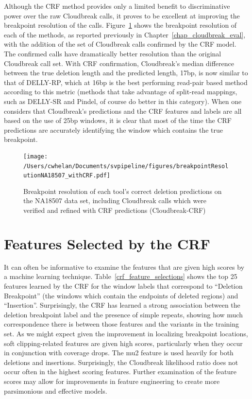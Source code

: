 Although the CRF method provides only a limited benefit to discriminative power over the raw Cloudbreak calls, it proves to be excellent at improving the breakpoint resolution of the calls. Figure~\ref{breakpoint_resolution_NA18507_with_crf} shows the breakpoint resolution of each of the methods, as reported previously in Chapter~\ref{chap_cloudbreak_eval}, with the addition of the set of Cloudbreak calls confirmed by the CRF model. The confirmed calls have dramatically better resolution than the original Cloudbreak call set. With CRF confirmation, Cloudbreak's median difference between the true deletion length and the predicted length, 17bp, is now similar to that of DELLY-RP, which at 16bp is the best performing read-pair based method according to this metric (methods that take advantage of split-read mappings, such as DELLY-SR and Pindel, of course do better in this category). When one considers that Cloudbreak's predictions and the CRF features and labels are all based on the use of 25bp windows, it is clear that most of the time the CRF predictions are accurately identifying the window which contains the true breakpoint.

\begin{figure}
\centering
\texttt{[image: /Users/cwhelan/Documents/svpipeline/figures/breakpointResolutionNA18507\_withCRF.pdf]}
\caption[Breakpoint resolution for deletions on the NA18507 data set, including Cloudbreak CRF calls.]{Breakpoint resolution of each tool's correct deletion predictions on the NA18507 data set, including Cloudbreak calls which were verified and refined with CRF predictions (Cloudbreak-CRF)}
\label{breakpoint_resolution_NA18507_with_crf}
\end{figure}

\section{Features Selected by the CRF}

It can often be informative to examine the features that are given high scores by a machine learning technique. Table~\ref{crf_feature_selections} shows the top 25 features learned by the CRF for the window labels that correspond to ``Deletion Breakpoint'' (the windows which contain the endpoints of deleted regions) and ``Insertion''. Surprisingly, the CRF has learned a strong association between the deletion breakpoint label and the presence of simple repeats, showing how much correspondence there is between those features and the variants in the training set. As we might expect given the improvement in localizing breakpoint locations, soft clipping-related features are given high scores, particularly when they occur in conjunction with coverage drops. The mu2 feature is used heavily for both deletions and insertions. Surprisingly, the Cloudbreak likelihood ratio does not occur often in the highest scoring features. Further examination of the feature scores may allow for improvements in feature engineering to create more parsimonious and effective models.

